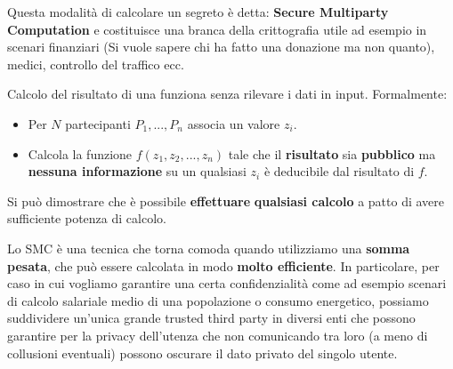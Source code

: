 Questa modalità di calcolare un segreto è detta: \textbf{Secure Multiparty Computation} e costituisce una branca della crittografia utile ad esempio in scenari finanziari (Si vuole sapere chi ha fatto una donazione ma non quanto), medici, controllo del traffico ecc. \pagebreak
\begin{definition}\label{def:smc}
Calcolo del risultato di una funziona senza rilevare i dati in input. Formalmente: 
\begin{itemize}
    \item Per $N$ partecipanti $P_1,...,P_n$ associa un valore $z_i$.
    \item Calcola la funzione $f(z_1,z_2,...,z_n)$ tale che il \textbf{risultato} sia \textbf{pubblico} ma \textbf{nessuna informazione} su un qualsiasi $z_i$ è deducibile dal risultato di $f$.
\end{itemize}
\begin{remark}
Si può dimostrare che è possibile \textbf{effettuare} \textbf{qualsiasi calcolo} a patto di avere sufficiente potenza di calcolo.
\end{remark}
\end{definition}
Lo SMC è una tecnica che torna comoda quando utilizziamo una \textbf{somma pesata}, che può essere calcolata in modo \textbf{molto efficiente}. In particolare, per caso in cui vogliamo garantire una certa confidenzialità come ad esempio scenari di calcolo salariale medio di una popolazione o consumo energetico, possiamo suddividere un'unica grande trusted third party in diversi enti che possono garantire per la privacy dell'utenza che non comunicando tra loro (a meno di collusioni eventuali) possono oscurare il dato privato del singolo utente.
